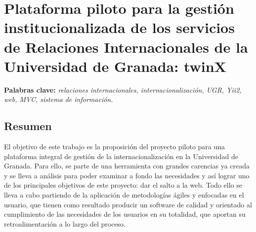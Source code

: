 \chapter*{Plataforma piloto para la gestión institucionalizada de los servicios de Relaciones Internacionales de la Universidad de Granada: twinX}

\textbf{Palabras clave:} \textit{relaciones internacionales, internacionalización, UGR, Yii2, web, MVC, sistema de información.}

\section*{Resumen}

\noindent El objetivo de este trabajo es la proposición del proyecto piloto para una plataforma integral de gestión de la internacionalización en la Universidad de Granada. Para ello, se parte de una herramienta con grandes carencias ya creada y se lleva a análisis para poder examinar a fondo las necesidades y así lograr uno de los principales objetivos de este proyecto: dar el salto a la web. Todo ello se lleva a cabo partiendo de la aplicación de metodologías ágiles y enfocadas en el usuario, que tienen como resultado producir un software de calidad y orientado al cumplimiento de las necesidades de los usuarios en su totalidad, que aportan su retroalimentación a lo largo del proceso.